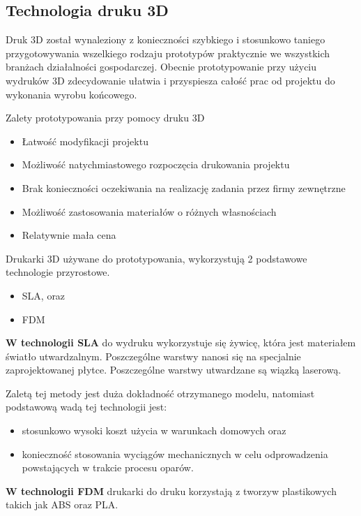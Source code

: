 \documentclass[a4paper,12pt,reqno]{article}
\begin{document}
\subsection{Technologia druku 3D}
Druk 3D został wynaleziony z konieczności szybkiego i stosunkowo taniego przygotowywania wszelkiego rodzaju prototypów praktycznie we wszystkich branżach działalności gospodarczej. 
Obecnie prototypowanie przy użyciu wydruków 3D zdecydowanie ułatwia i przyspiesza całość prac od projektu do wykonania wyrobu końcowego.

Zalety prototypowania przy pomocy druku 3D
\begin{itemize}
\item Łatwość modyfikacji projektu 
\item Możliwość natychmiastowego rozpoczęcia drukowania projektu
\item Brak konieczności oczekiwania na realizację zadania przez firmy zewnętrzne
\item Możliwość zastosowania materiałów o różnych własnościach
\item \textcolor{new}{Relatywnie mała cena}
\end{itemize}

Drukarki 3D używane do prototypowania, wykorzystują 2 podstawowe technologie przyrostowe.
\begin{itemize}
\item SLA, oraz
\item FDM
\end{itemize}
\textbf{W technologii SLA} do wydruku wykorzystuje się żywicę, która jest materiałem światło utwardzalnym. Poszczególne warstwy nanosi się na specjalnie zaprojektowanej płytce. Poszczególne warstwy utwardzane są wiązką laserową.

Zaletą tej metody jest duża dokładność otrzymanego modelu, natomiast podstawową wadą tej technologii jest:
\begin{itemize}
\item stosunkowo wysoki koszt użycia w warunkach domowych oraz
\item konieczność stosowania wyciągów mechanicznych w celu odprowadzenia powstających w trakcie procesu oparów.
\end{itemize}

\textbf{W technologii FDM} drukarki do druku korzystają z tworzyw plastikowych takich jak ABS oraz PLA.
\end{document}
